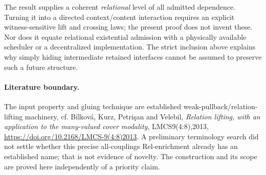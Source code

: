\documentclass[11pt]{article}
\begin{document}
The result supplies a coherent \emph{relational} level of all admitted dependence. Turning it into a directed context/content interaction requires an explicit witness-sensitive lift and crossing laws; the present proof does not invent these. Nor does it equate relational existential admission with a physically available scheduler or a decentralized implementation. The strict inclusion above explains why simply hiding intermediate retained interfaces cannot be assumed to preserve such a future structure.

\paragraph{Literature boundary.} The input property and gluing technique are established weak-pullback/relation-lifting machinery, cf. B\'ilkov\'a, Kurz, Petri\c{s}an and Velebil, \emph{Relation lifting, with an application to the many-valued cover modality}, LMCS9(4:8),2013, \url{https://doi.org/10.2168/LMCS-9(4:8)2013}. A preliminary terminology search did not settle whether this precise all-couplings Rel-enrichment already has an established name; that is not evidence of novelty. The construction and its scope are proved here independently of a priority claim.
\end{document}
